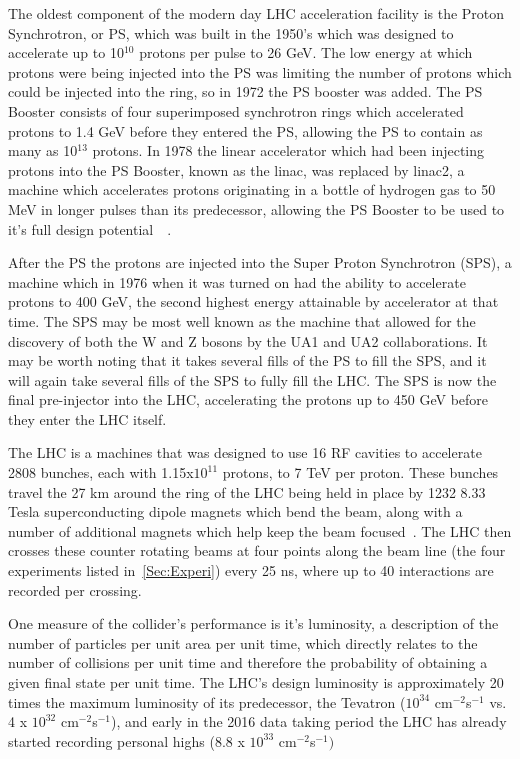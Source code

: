 The oldest component of the modern day LHC acceleration facility is the Proton Synchrotron, or PS, which was built in the 1950's which was designed to accelerate up to 10$^{10}$ protons per pulse to 26 GeV.  
The low energy at which protons were being injected into the PS was limiting the number of protons which could be injected into the ring, so in 1972 the PS booster was added.  
The PS Booster consists of four superimposed synchrotron rings which accelerated protons to 1.4 GeV before they entered the PS, allowing the PS to contain as many as 10$^{13}$ protons.  
In 1978 the linear accelerator which had been injecting protons into the PS Booster, known as the linac, was replaced by linac2, a machine which accelerates protons originating in a bottle of hydrogen gas to 50 MeV in longer pulses than its predecessor, allowing the PS Booster to be used to it's full design potential~\cite{PSHistory}~\cite{PSHistory2}.  

After the PS the protons are injected into the Super Proton Synchrotron (SPS), a machine which in 1976 when it was turned on had the ability to accelerate protons to 400 GeV, the second highest energy attainable by accelerator at that time.  
The SPS may be most well known as the machine that allowed for the discovery of both the W and Z bosons by the UA1 and UA2 collaborations.  
It may be worth noting that it takes several fills of the PS to fill the SPS, and it will again take several fills of the SPS to fully fill the LHC.  
The SPS is now the final pre-injector into the LHC, accelerating the protons up to 450 GeV before they enter the LHC itself.  

The LHC is a machines that was designed to use 16 RF cavities to accelerate 2808 bunches, each with 1.15x$10^{11}$ protons, to 7 TeV per proton.  
These bunches travel the 27 km around the ring of the LHC being held in place by 1232 8.33 Tesla superconducting dipole magnets which bend the beam, along with a number of additional magnets which help keep the beam focused~\cite{LHCTDR}.  
The LHC then crosses these counter rotating beams at four points along the beam line (the four experiments listed in~\ref{Sec:Experi}) every 25 ns, where up to 40 interactions are recorded per crossing.  

One measure of the collider's performance is it's luminosity, a description of the number of particles per unit area per unit time, which directly relates to the number of collisions per unit time and therefore the probability of obtaining a given final state per unit time.  
The LHC's design luminosity is approximately 20 times the maximum luminosity of its predecessor, the Tevatron ($10^{34}$ cm$^{-2}$s$^{-1}$ vs. 4 x $10^{32}$ cm$^{-2}$s$^{-1}$), and early in the 2016 data taking period the LHC has already started recording personal highs (8.8 x $10^{33}$ cm$^{-2}$s$^{-1})$

